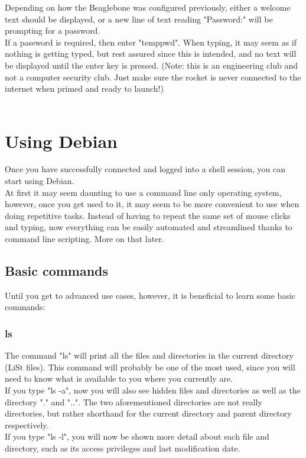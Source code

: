 \documentclass[12pt,article]{memoir}
\begin{document}
\noindent
Depending on how the Beaglebone was configured previously, either a welcome text should be displayed, or a new line of text reading "Password:" will be prompting for a password.\\
If a password is required, then enter "temppwd". When typing, it may seem as if nothing is getting typed, but rest assured since this is intended, and no text will be displayed until the enter key is pressed. (Note: this is an engineering club and not a computer security club. Just make sure the rocket is never connected to the internet when primed and ready to launch!)\\\\



\newpage
\section{Using Debian}
Once you have successfully connected and logged into a shell session, you can start using Debian.\\

\noindent
At first it may seem daunting to use a command line only operating system, however, once you get used to it, it may seem to be more convenient to use when doing repetitive tasks. Instead of having to repeat the same set of mouse clicks and typing, now everything can be easily automated and streamlined thanks to command line scripting. More on that later.\\

\subsection{Basic commands}
Until you get to advanced use cases, however, it is beneficial to learn some basic commands:\\

\subsubsection{ls}
The command "ls" will print all the files and directories in the current directory (LiSt files). This command will probably be one of the most used, since you will need to know what is available to you where you currently are.\\
\noindent
If you type "ls -a", now you will also see hidden files and directories as well as the directory "." and "..". The two aforementioned directories are not really directories, but rather shorthand for the current directory and parent directory respectively.\\
\noindent
If you type "ls -l", you will now be shown more detail about each file and directory, such as its access privileges and last modification date.\\
\end{document}
